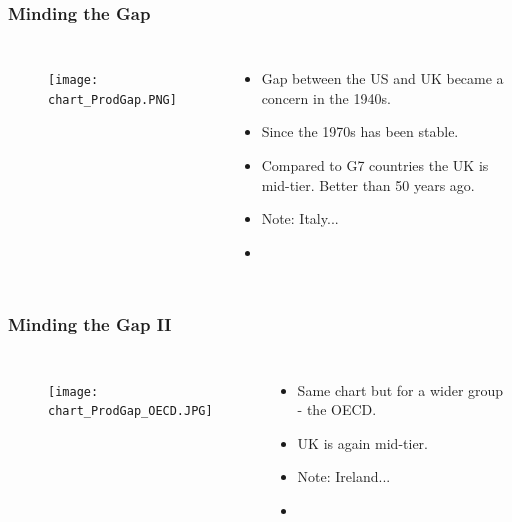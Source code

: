 \documentclass{beamer}
\begin{document}
\begin{frame}
\frametitle{Minding the Gap}

\begin{columns}


\begin{figure}
\centering
\texttt{[image: chart\_ProdGap.PNG]}
\end{figure}


\begin{itemize}
\item Gap between the US and UK became a concern in the 1940s.
\item Since the 1970s has been stable. 
\item Compared to G7 countries the UK is mid-tier. Better than 50 years ago.
\item Note: Italy... 

\item \href{https://www.rapidcharts.io/productivity}{}
\end{itemize}



\end{columns}
\end{frame}


\begin{frame}
\frametitle{Minding the Gap II}

\begin{columns}


\begin{figure}
\centering
\texttt{[image: chart\_ProdGap\_OECD.JPG]}
\end{figure}


\begin{itemize}
\item Same chart but for a wider group - the OECD.
\item UK is again mid-tier.
\item Note: Ireland... 

\item \href{https://www.rapidcharts.io/productivity}{}
\end{itemize}



\end{columns}
\end{frame}
\end{document}
